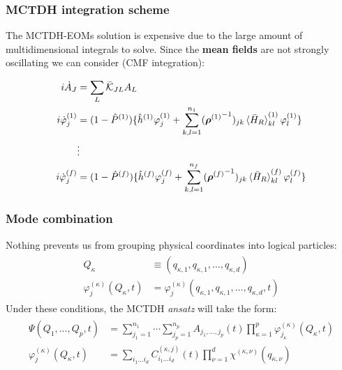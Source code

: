 \documentclass{beamer}
\begin{document}
\begin{frame}
  \frametitle{MCTDH integration scheme}
  The MCTDH-EOMs solution is expensive due to the large amount of multidimensional integrals to solve. Since the \textbf{mean fields} are not strongly oscillating we can consider (CMF integration):
  \begin{block}{}
\begin{align}
\begin{split}
i\dot{A}_J &= \sum_L \bar{\mathcal{K}}_{JL} A_L \\
i\dot{\varphi}^{(1)}_j &= (1 - \hat{P}^{(1)})\{\hat{h}^{(1)}\varphi^{(1)}_j + \sum_{k,l=1}^{n_{1}}({\bm{\rho}^{(1)}}^{-1})_{jk}\braket{\bar{H}_R}_{kl}^{(1)}\varphi^{(1)}_l\} \\
           &\vdots \\
i\dot{\varphi}^{(f)}_j &= (1 - \hat{P}^{(f)})\{\hat{h}^{(f)}\varphi^{(f)}_j + \sum_{k,l=1}^{n_{f}}({\bm{\rho}^{(f)}}^{-1})_{jk}\braket{\bar{H}_R}_{kl}^{(f)}\varphi^{(f)}_l\}  
\label{mctdh_eom_mod_dec}
\end{split}	
\end{align}
\end{block}
  
\end{frame}
\begin{frame}
  \frametitle{Mode combination}
  Nothing prevents us from grouping physical coordinates into logical particles:
\begin{align}
\begin{split}
	Q_{\kappa} &\equiv (q_{\kappa,1}, q_{\kappa,1}, \ldots, q_{\kappa,d}) \\
	\varphi_{j}^{(\kappa)}(Q_{\kappa}, t) &= \varphi_{j}^{(\kappa)}(q_{\kappa,1}, q_{\kappa,1}, \ldots, q_{\kappa,d}, t)
\end{split}
\end{align}
Under these conditions, the MCTDH \emph{ansatz} will take the form:
\begin{align}
  \begin{split}
    \Psi(Q_1,\ldots, Q_p, t) &= \sum^{n_1}_{j_1=1}\cdots\sum^{n_p}_{j_p=1}A_{j_1,\ldots,j_p}(t)\prod^{p}_{\kappa=1}\varphi^{(\kappa)}_{j_{\kappa}}(Q_{\kappa}, t) \\
	\varphi_{j}^{(\kappa)}(Q_{\kappa}, t) &= \sum_{i_1 \ldots i_d} C^{(\kappa, j)}_{i_1 \ldots i_d}(t)\prod^{d}_{\nu=1}
	\chi^{(\kappa, \nu)}(q_{\kappa, \nu})
  \end{split}
	\label{mctdh_antz_mc}
\end{align}
  
\end{frame}
\end{document}
